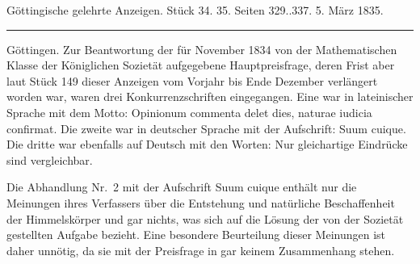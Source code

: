 \clearpage
{}
\begin{center}\small Göttingische gelehrte Anzeigen. Stück 34. 35. Seiten 329..337. 5. März 1835.\\[3pt]\rule{.72\linewidth}{.3pt}\end{center}

Göttingen. Zur Beantwortung der für November 1834 von der Mathematischen Klasse der Königlichen Sozietät aufgegebene Hauptpreisfrage, deren Frist aber laut Stück 149 dieser Anzeigen vom Vorjahr bis Ende Dezember verlängert worden war, waren drei Konkurrenzschriften eingegangen. Eine war in lateinischer Sprache mit dem Motto: Opinionum commenta delet dies, naturae iudicia confirmat. Die zweite war in deutscher Sprache mit der Aufschrift: Suum cuique. Die dritte war ebenfalls auf Deutsch mit den Worten: Nur gleichartige Eindrücke sind vergleichbar.

Die Abhandlung Nr.~2 mit der Aufschrift Suum cuique enthält nur die Meinungen ihres Verfassers über die Entstehung und natürliche Beschaffenheit der Himmelskörper und gar nichts, was sich auf die Lösung der von der Sozietät gestellten Aufgabe bezieht. Eine besondere Beurteilung dieser Meinungen ist daher unnötig, da sie mit der Preisfrage in gar keinem Zusammenhang stehen.


